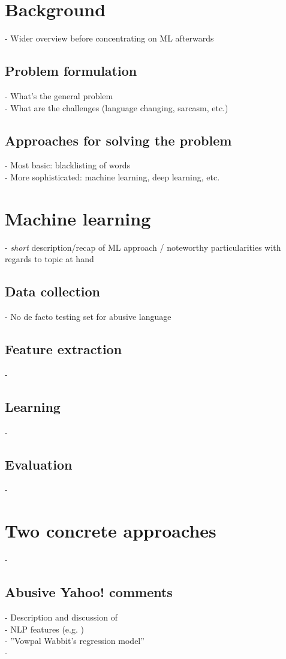\documentclass{proseminar}
\begin{document}
\section{Background}
- Wider overview before concentrating on ML afterwards
\subsection{Problem formulation}
- What's the general problem\\
- What are the challenges (language changing, sarcasm, etc.)
\subsection{Approaches for solving the problem}
- Most basic: blacklisting of words\\
- More sophisticated: machine learning, deep learning, etc.

\section{Machine learning}
- \emph{short} description/recap of ML approach / noteworthy particularities with regards to topic at hand
\subsection{Data collection}
- No de facto testing set for abusive language\cite{Yahoo:2016}
\subsection{Feature extraction}
-
\subsection{Learning}
-
\subsection{Evaluation}
-

\section{Two concrete approaches}
-
\subsection{Abusive Yahoo! comments}
- Description and discussion of \cite{Yahoo:2016}\\
\hphantom{- }- NLP features (e.g. \cite{Distributed:2014})\\
\hphantom{- }- ''Vowpal Wabbit's regression model''\\
\hphantom{- }-
\end{document}
